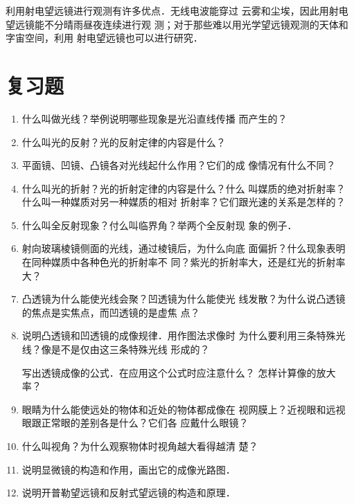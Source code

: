 利用射电望远镜进行观测有许多优点．无线电波能穿过
云雾和尘埃，因此用射电望远镜能不分晴雨昼夜连续进行观
测；对于那些难以用光学望远镜观测的天体和字宙空间，利用
射电望远镜也可以进行研究．

\section*{复习题}
\begin{enumerate}
\item 什么叫做光线？举例说明哪些现象是光沿直线传播
而产生的？
\item 什么叫光的反射？光的反射定律的内容是什么？
\item 平面镜、凹镜、凸镜各对光线起什么作用？它们的成
像情况有什么不同？
\item 什么叫光的折射？光的折射定律的内容是什么？什么
叫媒质的绝对折射率？什么叫一种媒质对另一种媒质的相对
折射率？它们跟光速的关系是怎样的？
\item 什么叫全反射现象？付么叫临界角？举两个全反射现
象的例子．
\item 射向玻璃棱镜侧面的光线，通过棱镜后，为什么向底
面偏折？什么现象表明在同种媒质中各种色光的折射率不
同？紫光的折射率大，还是红光的折射率大？
\item 凸透镜为什么能使光线会聚？凹透镜为什么能使光
线发散？为什么说凸透镜的焦点是实焦点，而凹透镜的是虚焦
点？
\item 说明凸透镜和凹透镜的成像规律．用作图法求像时
为什么要利用三条特殊光线？像是不是仅由这三条特殊光线
形成的？

写出透镜成像的公式．在应用这个公式时应注意什么？
怎样计算像的放大率？
\item 眼睛为什么能使远处的物体和近处的物体都成像在
视网膜上？近视眼和远视眼跟正常眼的差别各是什么？它们各
应戴什么眼镜？
\item 什么叫视角？为什么观察物体时视角越大看得越清
楚？
\item 说明显微镜的构造和作用，画出它的成像光路图．
\item 说明开普勒望远镜和反射式望远镜的构造和原理．

\end{enumerate}

